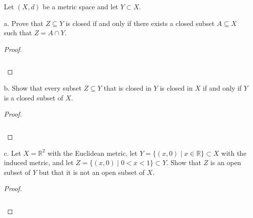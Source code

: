 Let $(X, d)$ be a metric space and let $Y \subset X$.

a.  Prove that $Z \subseteq Y$ is closed if and only if there exists a closed subset $A \subseteq X$ such that 
    $Z = A \cap Y$. 

\begin{proof}\renewcommand{\qedsymbol}{}\ \\\\
    \begin{align*}
    \end{align*}
\end{proof}

\pagebreak

b.  Show that every subset $Z \subseteq Y$ that is closed in $Y$ is closed in $X$ if and  only if $Y$ is a closed subset
    of $X$.

\begin{proof}\renewcommand{\qedsymbol}{}\ \\\\
    \begin{align*}
    \end{align*}
\end{proof}

\pagebreak

c.  Let $X = \mathbb{R}^2$ with the Euclidean metric, let $Y = \{(x, 0) \mid x \in \mathbb{R} \} \subset X$ with the
    induced metric, and let $Z = \{(x, 0) \mid 0 < x < 1 \} \subset Y$. Show that $Z$ is an open subset of $Y$ but that
    it is not an open subset of $X$.

\begin{proof}\renewcommand{\qedsymbol}{}\ \\\\
    \begin{align*}
    \end{align*}
\end{proof}

\pagebreak